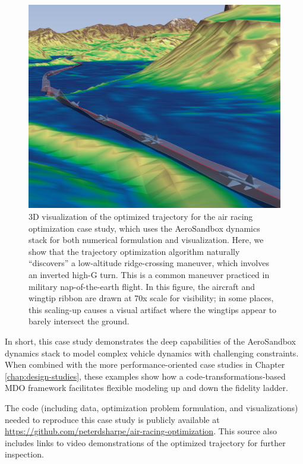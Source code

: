 \begin{figure}[h]
    \centering
    \includegraphics[width=\textwidth]{../figures/air-racing/3.png}
    \caption{3D visualization of the optimized trajectory for the air racing optimization case study, which uses the AeroSandbox dynamics stack for both numerical formulation and visualization. Here, we show that the trajectory optimization algorithm naturally ``discovers'' a low-altitude ridge-crossing maneuver, which involves an inverted high-G turn. This is a common maneuver practiced in military nap-of-the-earth flight. In this figure, the aircraft and wingtip ribbon are drawn at 70x scale for visibility; in some places, this scaling-up causes a visual artifact where the wingtips appear to barely intersect the ground.}
    \label{fig:air-racing-3}
\end{figure}

In short, this case study demonstrates the deep capabilities of the AeroSandbox dynamics stack to model complex vehicle dynamics with challenging constraints. When combined with the more performance-oriented case studies in Chapter \ref{chap:design-studies}, these examples show how a code-transformations-based MDO framework facilitates flexible modeling up and down the fidelity ladder.

The code (including data, optimization problem formulation, and visualizations) needed to reproduce this case study is publicly available at \url{https://github.com/peterdsharpe/air-racing-optimization}. This source also includes links to video demonstrations of the optimized trajectory for further inspection.


